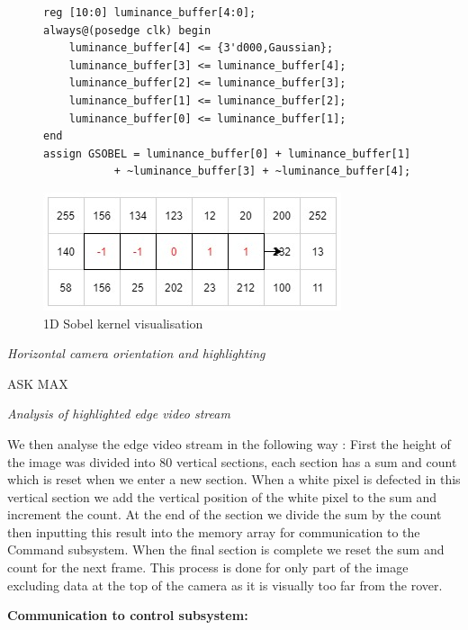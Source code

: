 \documentclass[10pt,twoside]{article}
\begin{document}
\begin{figure}[hbt]
\begin{minipage}{.56\textwidth}
\begin{verbatim}
reg [10:0] luminance_buffer[4:0];
always@(posedge clk) begin
    luminance_buffer[4] <= {3'd000,Gaussian}; 
	luminance_buffer[3] <= luminance_buffer[4]; 
	luminance_buffer[2] <= luminance_buffer[3]; 
	luminance_buffer[1] <= luminance_buffer[2]; 
	luminance_buffer[0] <= luminance_buffer[1];
end
assign GSOBEL = luminance_buffer[0] + luminance_buffer[1] 
           + ~luminance_buffer[3] + ~luminance_buffer[4]; 
\end{verbatim}
\end{minipage}
\begin{minipage}{.42\textwidth}
            \includegraphics[scale = 0.4]{Method2Matrix.jpg}
            \centering
            \caption{1D Sobel kernel visualisation}
            \label{fig:InitalDesign}
\end{minipage}
\end{figure}

\textit{Horizontal camera orientation and highlighting}

ASK MAX

\textit{Analysis of highlighted edge video stream}

We then analyse the edge video stream in the following way : First the height of the image was divided into  80 vertical sections, each section has a sum and count which is reset when we enter a new section. When a white pixel is defected in this vertical section we add the vertical position of the white pixel to the sum and increment the count. At the end of the section we divide the sum by the count then inputting this result into the memory array for communication to the Command subsystem. When the final section is complete we reset the sum and count for the next frame. This process is done for only part of the image excluding data at the top of the camera as it is visually too far from the rover. 

\textbf{Communication to control subsystem:}
\end{document}
